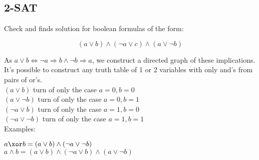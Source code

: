 \subsection{2-SAT}

Check and finds solution for boolean formulas of the form:

$$(a \lor b) \land (\neg a \lor c) \land (a \lor \neg b)$$

As $a \lor b \iff \neg a \Rightarrow b \land \neg b \Rightarrow a$, we construct a directed graph of these implications. It's possible to construct any truth table of 1 or 2 variables with only and's from pairs of or's. \\
\hfill \break
$(a \lor b)$ turn of only the case $a=0, b=0$ \\
$(a \lor \neg b)$ turn of only the case $a=0, b=1$ \\ 
$(\neg a \lor b)$ turn of only the case $a=1, b=0$ \\
$(\neg a \lor \neg b)$ turn of only the case $a=1, b=1$ \\
\hfill \break
Examples:

$a \xor b = (a \lor b) \land (\neg a \lor \neg b)$ \\
$a \land b = (a \lor b) \land (\neg a \lor b) \land (a \lor \neg b)$ \\